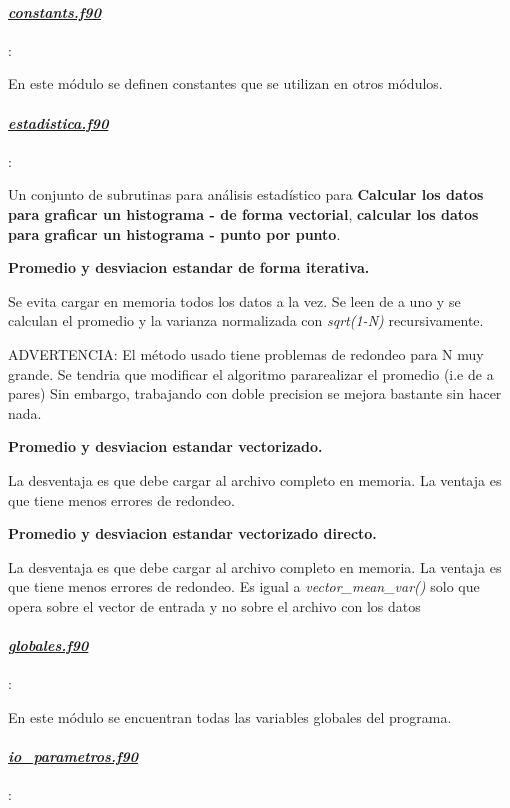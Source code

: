 \paragraph{\underline{\textit{constants.f90}}}:

 En este módulo se definen constantes que se utilizan en otros módulos. 

\paragraph{\underline{\textit{estadistica.f90}}}:

Un conjunto de subrutinas para análisis estad\'istico para 
\textbf{Calcular los datos para graficar un histograma - de forma vectorial},  
	  \textbf{calcular los datos para graficar un histograma - punto por punto}.

	  \textbf{Promedio y desviacion estandar de forma iterativa.}

 Se evita cargar en memoria todos los datos a la vez. Se leen de a uno y se 
 calculan el promedio y la varianza normalizada con \textit{sqrt(1-N)} recursivamente. 

 ADVERTENCIA: El método usado tiene problemas de redondeo para N muy grande.
 Se tendria que modificar el algoritmo pararealizar el promedio (i.e de a pares)
 Sin embargo, trabajando con doble precision se mejora bastante sin hacer nada.


 \textbf{Promedio y desviacion estandar vectorizado.}

 La desventaja es que debe cargar al archivo completo en memoria. La ventaja es
 que tiene menos errores de redondeo.


 \textbf{Promedio y desviacion estandar vectorizado directo.}

 La desventaja es que debe cargar al archivo completo en memoria. La ventaja es
 que tiene menos errores de redondeo.
 Es igual a \textit{vector\_mean\_var()} solo que opera sobre el vector de entrada
 y no sobre el archivo con los datos



\paragraph{\underline{\textit{globales.f90}}}:

En este  m\'odulo se encuentran  todas las variables globales del programa.
	
\paragraph{\underline{\textit{io\_parametros.f90}}}:

